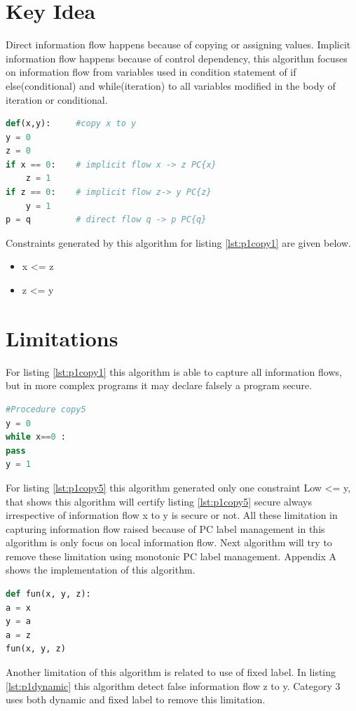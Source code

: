 \section{Key Idea}
Direct information flow happens because of copying or assigning values. Implicit information flow happens because of control dependency, this algorithm focuses on information flow from variables used in condition statement of if else(conditional)
and while(iteration) to all variables modified in the body of iteration or conditional.
\begin{lstlisting}[language=Python,caption={Python example}, label={lst:p1copy1}]
def(x,y):     #copy x to y
y = 0
z = 0
if x == 0:    # implicit flow x -> z PC{x}
	z = 1
if z == 0:    # implicit flow z-> y PC{z}
	y = 1
p = q         # direct flow q -> p PC{q}
\end{lstlisting}
Constraints generated by this algorithm for listing \ref{lst:p1copy1} are given below. 
\begin{itemize}
	\item x <= z
	\item z <= y
\end{itemize}
\section{Limitations}
For listing \ref{lst:p1copy1} this algorithm is able to capture all information flows, but in more complex programs it may declare falsely a program secure.
\begin{lstlisting}[language=Python, caption=Python version of copy5 example in \cite{denning}. goal: information flow from x to y, label={lst:p1copy5} ]
#Procedure copy5
y = 0
while x==0 :
pass
y = 1
\end{lstlisting}
For listing \ref{lst:p1copy5} this algorithm generated only one constraint Low <= y, that shows this algorithm will certify listing \ref{lst:p1copy5} secure always irrespective of information flow x to y is secure or not. All these limitation in capturing information flow raised because of PC label management in this algorithm is only focus on local information flow. Next algorithm will try to remove these limitation using monotonic PC label management. Appendix A shows the implementation of this algorithm.
\begin{lstlisting}[language=Python, caption=Python version of dynamic label example in \cite{denning}. goal: information flow from x to y, label={lst:p1dynamic} ]
def fun(x, y, z):
a = x
y = a
a = z
fun(x, y, z)
\end{lstlisting}
Another limitation of this algorithm is related to use of fixed label. In listing \ref{lst:p1dynamic} this algorithm detect false information flow z to y. Category 3 uses both dynamic and fixed label to remove this limitation. 
